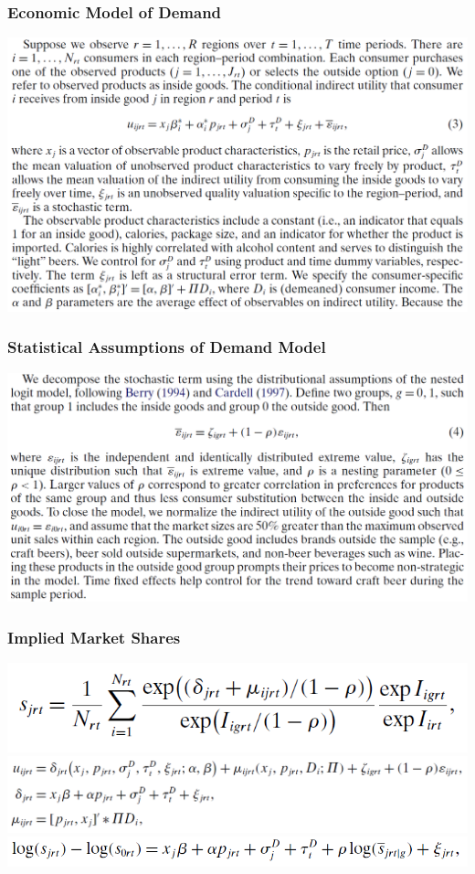 \documentclass{beamer}
\begin{document}
\begin{frame}\frametitle{Economic Model of Demand}
    \centering
    \includegraphics[width=0.95\linewidth]{eq_3}
\end{frame}

\begin{frame}\frametitle{Statistical Assumptions of Demand Model}
    \centering
    \includegraphics[width=0.95\linewidth]{eq_4}
\end{frame}

\begin{frame}\frametitle{Implied Market Shares}
    \centering
    \includegraphics[width=0.6\linewidth]{eq_6} \\
    \vspace{4ex}
    \includegraphics[width=0.9\linewidth]{eq_5} \\
    \vspace{4ex}
    \includegraphics[width=0.8\linewidth]{eq_7}
\end{frame}
\end{document}
